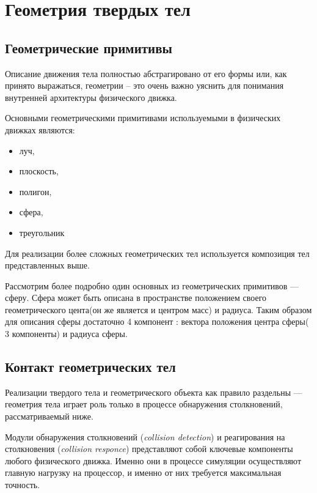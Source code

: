 \chapter{Геометрия твердых тел}
\section{Геометрические примитивы}
Описание движения тела полностью абстрагировано от его формы
или, как принято выражаться, геометрии – это очень важно
уяснить для понимания внутренней архитектуры физического
движка.

Основными геометрическими примитивами используемыми в физических движках являются:
\begin{itemize}
 \item  луч, 
 \item  плоскость,
 \item  полигон,
 \item  сфера,
 \item  треугольник
 \end{itemize}
Для реализации более сложных геометрических тел используется композиция тел представленных выше.

Рассмотрим более подробно один основных из геометрических примитивов --- сферу.
Сфера может быть описана в пространстве положением своего геометрического цента(он же является и центром масс)
и радиуса. Таким образом для описания сферы достаточно 4 компонент : вектора положения центра сферы( 3 компоненты) и радиуса сферы.


\section{Контакт геометрических тел}
Реализации твердого тела и геометрического объекта как правило раздельны --- геометрия тела играет роль только в
процессе обнаружения столкновений, рассматриваемый ниже.

Модули обнаружения столкновений (\textit{collision detection}) и реагирования на столкновения (\textit{collision responce}) представляют 
собой ключевые компоненты любого физического движка. Именно они в процессе симуляции осуществляют главную нагрузку на
процессор, и именно от них требуется максимальная точность.


